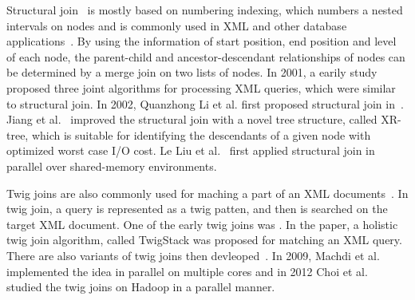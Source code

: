 Structural join~\cite{AlJYK02} is mostly based on numbering
indexing\cite{numbering}, which numbers a nested intervals on nodes and is
commonly used in XML and other database
applications~\cite{ZNDI01,HAJR03,ZNDI01}. By using the information of start
position, end position and level of each node, the parent-child and
ancestor-descendant relationships of nodes can be determined by a merge join on
two lists of nodes. In 2001, a earily study~\cite{LiMo01} proposed three joint
algorithms for processing XML queries, which were similar to structural join. In
2002, Quanzhong Li et al. first proposed structural join in~\cite{AlJYK02}.
Jiang et al.~\cite{JLWO03} improved the structural join with a novel tree
structure, called XR-tree, which is suitable for identifying the descendants of
a given node with optimized worst case I/O cost. Le Liu et al.~\cite{LFLQ08}
first applied structural join in parallel over shared-memory environments.

Twig joins are also commonly used for maching a part of an XML
documents~\cite{jiang2003holistic,lu2005efficient,lu2005tjfast,
	fontoura2005optimizing}. In twig join, a query is represented as a twig patten,
and then is searched on the target XML document. One of the early twig joins was
\cite{BrKS02}. In the paper, a holistic twig join algorithm, called TwigStack
was proposed for matching an XML query. There are also variants of twig joins
then devleoped~\cite{CLTH06,QiYD07}. In 2009, Machdi et al.~\cite{MaAK09}
implemented the idea in parallel on multiple cores and in 2012 Choi et
al.~\cite{CLKL12} studied the twig joins on Hadoop in a parallel manner.

